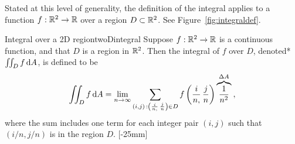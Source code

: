 \documentclass[svgnames]{watsonbook}
\begin{document}
  Stated at this level of generality, the definition of the integral
  applies to a function $f: \mathbb{R}^2 \to \mathbb{R}$ over a region $D
  \subset \mathbb{R}^2$. See Figure~\ref{fig:integraldef}. 
  \begin{defn}{Integral over a 2D region}{twoDintegral}
    Suppose $f: \mathbb{R}^2 \to \mathbb{R}$ is a continuous function, and that $D$ is a region in
    $\mathbb{R}^2$. Then the integral of $f$ over $D$, denoted*
    $\iint_D f \, \mathrm{d} A$, is defined to be
    \begin{equation} \label{eq:def2D}
      \iint_D f \, \mathrm{d} A = \lim_{n\to\infty} \sum_{(i,j) \, : \left(\frac{i}{n,} \,\frac{j}{n}\right) \in D}
      f\left(\frac{i}{n,}\,\frac{j}{n}\right)
      \overbrace{\frac{1}{n^2}}^{\Delta A} \:,  
    \end{equation}
    where the sum includes one term for each integer pair $(i,j)$ such
    that $(i/n,j/n)$ is in the region $D$.   [-25mm]
  \end{defn}
\end{document}
